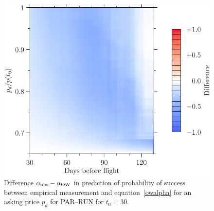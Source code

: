 \documentclass{article}
\begin{document}
\begin{figure}
  \begin{center}
    \includegraphics{pdf/PARRUN_SAT_7_a1_A0}
    \caption{Difference $\alpha_{\rm{obs}} - \alpha_{\rm{OW}}$ in
      prediction of probability of success between empirical
      measurement and equation~\eqref{owalpha} for an asking price
      $p_d$ for PAR--RUN for $t_0=30$.}
    \label{PARRUN_SAT_7_a1_A0}
  \end{center}
\end{figure}
\end{document}
